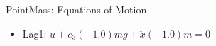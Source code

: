 PointMass: Equations of Motion
\begin{itemize}
\item Lag1: $u+e_3 (-1.0) m g+\ddot{x} (-1.0) m = 0$
\end{itemize}